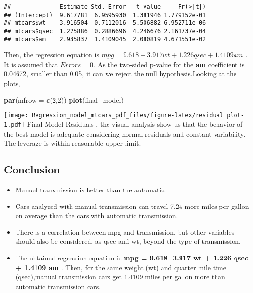 \documentclass[
]{article}
\newenvironment{Shaded}{\begin{snugshade}}{\end{snugshade}}
\newcommand{\AttributeTok}[1]{\textcolor[rgb]{0.13,0.29,0.53}{#1}}
\newcommand{\DecValTok}[1]{\textcolor[rgb]{0.00,0.00,0.81}{#1}}
\newcommand{\FunctionTok}[1]{\textcolor[rgb]{0.13,0.29,0.53}{\textbf{#1}}}
\newcommand{\NormalTok}[1]{#1}
\providecommand{\tightlist}{%
  \setlength{\itemsep}{0pt}\setlength{\parskip}{0pt}}
\begin{document}
\begin{verbatim}
##              Estimate Std. Error   t value     Pr(>|t|)
## (Intercept)  9.617781  6.9595930  1.381946 1.779152e-01
## mtcars$wt   -3.916504  0.7112016 -5.506882 6.952711e-06
## mtcars$qsec  1.225886  0.2886696  4.246676 2.161737e-04
## mtcars$am    2.935837  1.4109045  2.080819 4.671551e-02
\end{verbatim}

Then, the regression equation is
\(mpg = 9.618 -3.917 wt + 1.226 qsec + 1.4109 am\) . It is assumed that
\(Errors = 0\). As the two-sided p-value for the \textbf{am} coefficient
is 0.04672, smaller than 0.05, it can we reject the null
hypothesis.Looking at the plots,

\begin{Shaded}
\begin{Highlighting}[]
\FunctionTok{par}\NormalTok{(}\AttributeTok{mfrow =} \FunctionTok{c}\NormalTok{(}\DecValTok{2}\NormalTok{,}\DecValTok{2}\NormalTok{))}
\FunctionTok{plot}\NormalTok{(final\_model)}
\end{Highlighting}
\end{Shaded}

\texttt{[image: Regression\_model\_mtcars\_pdf\_files/figure-latex/residual plot-1.pdf]}
Final Model Residuals , the visual analysis show us that the behavior of
the best model is adequate considering normal residuals and constant
variability. The leverage is within reasonable upper limit.

\hypertarget{conclusion}{%
\subsection{Conclusion}\label{conclusion}}

\begin{itemize}
\tightlist
\item
  Manual transmission is better than the automatic.
\item
  Cars analyzed with manual transmission can travel 7.24 more miles per
  gallon on average than the cars with automatic transmission.
\item
  There is a correlation between mpg and transmission, but other
  variables should also be considered, as qsec and wt, beyond the type
  of transmission.
\item
  The obtained regression equation is \textbf{mpg = 9.618 -3.917 wt +
  1.226 qsec + 1.4109 am} . Then, for the same weight (wt) and quarter
  mile time (qsec),manual transmission cars get 1.4109 miles per gallon
  more than automatic transmission cars.
\end{itemize}
\end{document}
